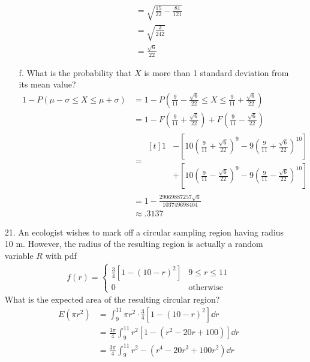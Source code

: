 \documentclass[letterpaper,12pt]{article}
\begin{document}
\begin{enumerate}
\begin{enumerate}
\begin{align*}
          &= \sqrt{\frac{15}{22} - \frac{81}{121}} \\
          &= \sqrt{\frac{3}{242}} \\
          &= \frac{\sqrt{6}}{22}
        \end{align*}
      \item[f.]
        What is the probability that $X$ is more than 1 standard deviation from its mean value?
        \begin{align*}
          1 - P(\mu - \sigma \le X \le \mu + \sigma) &= 1 - P\left(\frac{9}{11} - \frac{\sqrt{6}}{22} \le X \le \frac{9}{11} + \frac{\sqrt{6}}{22}\right) \\
          &= 1 - F\left(\frac{9}{11} + \frac{\sqrt{6}}{22}\right) + F\left(\frac{9}{11} - \frac{\sqrt{6}}{22}\right) \\
          &= \begin{aligned}[t]
            1 &- \left[10\left(\frac{9}{11} + \frac{\sqrt{6}}{22}\right)^9 - 9\left(\frac{9}{11} + \frac{\sqrt{6}}{22}\right)^{10}\right] \\
            &+ \left[10\left(\frac{9}{11} - \frac{\sqrt{6}}{22}\right)^9 - 9\left(\frac{9}{11} - \frac{\sqrt{6}}{22}\right)^{10}\right]
          \end{aligned} \\
          &= 1 - \frac{29069887257\sqrt{6}}{103749698404} \\
          &\approx .3137
        \end{align*}
    \end{enumerate}
  \item[21.]
    An ecologist wishes to mark off a circular sampling region having radius 10 m. However, the radius of the resulting region is actually a random variable $R$ with pdf
    \begin{align*}
      f(r) = \begin{cases}
        \frac{3}{4}[1 - (10 - r)^2] & 9 \le r \le 11 \\
        0                           & \text{otherwise}
      \end{cases}
    \end{align*}
    What is the expected area of the resulting circular region?
    \begin{align*}
      E(\pi r^2) &= \int_{9}^{11} \pi r^2 \cdot \frac{3}{4}[1 - (10 - r)^2] \dd{r} \\
      &= \frac{3\pi}{4} \int_{9}^{11} r^2 [1 - (r^2 - 20r + 100)] \dd{r} \\
      &= \frac{3\pi}{4} \int_{9}^{11} r^2 - (r^4 - 20r^3 + 100r^2) \dd{r} \\

\end{align*}
\end{enumerate}
\end{document}

